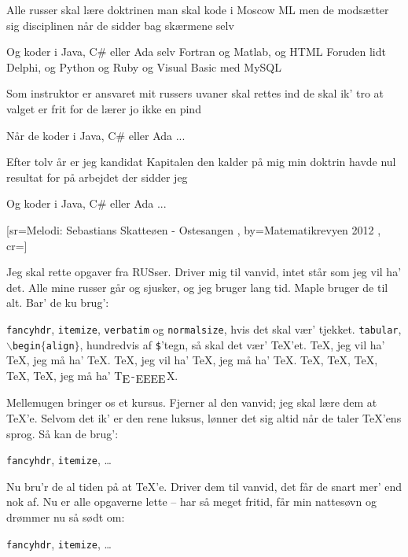 \documentclass[pdftex,12pt]{article}
\begin{document}
\begin{songs}{}
\beginverse
Alle russer skal lære doktrinen
man skal kode i Moscow ML
men de modsætter sig disciplinen
når de sidder bag skærmene selv

\endverse
\beginverse
Og koder i Java, C\# eller Ada
selv Fortran og Matlab, og HTML
Foruden lidt Delphi, og Python og Ruby
og Visual Basic med MySQL

\endverse
\beginverse
Som instruktor er ansvaret mit
russers uvaner skal rettes ind
de skal ik' tro at valget er frit
for de lærer jo ikke en pind

\endverse
\beginverse
Når de koder i Java, C\# eller Ada ...

\endverse
\beginverse
Efter tolv år er jeg kandidat
Kapitalen den kalder på mig
min doktrin havde nul resultat
for på arbejdet der sidder jeg

\endverse
\beginverse
Og koder i Java, C\# eller Ada ...

\endverse
\endsong



﻿[sr={Melodi: Sebastians Skatteøen - Ostesangen}
,
by={Matematikrevyen 2012}
,
cr={}]\hypertarget{TeX'e-sangen}{}
\label{song52}

\beginverse
Jeg skal rette opgaver fra RUSser.
Driver mig til vanvid,
intet står som jeg vil ha' det.
Alle mine russer går og sjusker,
og jeg bruger lang tid.
Maple bruger de til alt.
Bar' de ku brug':
\endverse

\beginverse
\texttt{fancyhdr}, \texttt{itemize},
\texttt{verbatim} og \texttt{normalsize},
hvis det skal vær' tjekket.
\texttt{tabular}, \texttt{$\backslash$begin$\{$align$\}$},
hundredvis af \texttt{\$}'tegn,
så skal det vær' \TeX'et.
\TeX, jeg vil ha' \TeX, jeg må ha' \TeX.
\TeX, jeg vil ha' \TeX, jeg må ha' \TeX.
\TeX, \TeX, \TeX, \TeX, \TeX, jeg må ha' T\!$_{\text{\normalsize E}}$-$_{\text{\normalsize EEEE}}$\!X.
\endverse

\beginverse
Mellemugen bringer os et kursus.
Fjerner al den vanvid;
jeg skal lære dem at \TeX'e.
Selvom det ik' er den rene luksus,
lønner det sig altid
når de taler \TeX'ens sprog.
Så kan de brug':
\endverse

\beginverse
\texttt{fancyhdr}, \texttt{itemize}, \ldots
\endverse

\beginverse
Nu bru'r de al tiden på at \TeX'e.
Driver dem til vanvid,
det får de snart mer' end nok af.
Nu er alle opgaverne lette
-- har så meget fritid,
får min nattesøvn
og drømmer nu så sødt om:
\endverse

\beginverse
\texttt{fancyhdr}, \texttt{itemize}, \ldots
\endverse


\end{songs}
\end{document}

